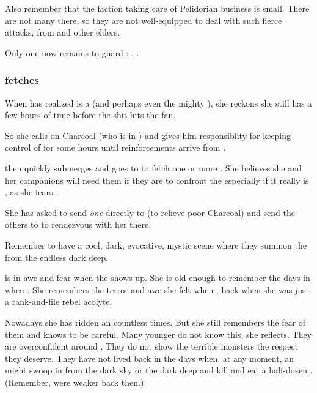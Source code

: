 Also remember that the faction taking care of Pelidorian business is small. 
There are not many \resphain there, so they are not well-equipped to deal with such fierce \dragon attacks, from \shaeeroth and other elders.

Only one \resphan{} now remains to guard \Malcur: \Paerzim. 
. 





\subsubsection{\Achsah fetches \umbrae}
When \Achsah{} has realized \Takestsha{} is a \dragon{} (and perhaps even the mighty \Nzessuacrith), she reckons she still has a few hours of time before the shit hits the fan. 

So she calls on Charcoal (who is in \Forclin) and gives him responsiblity for keeping control of \Forclin{} for some hours until reinforcements arrive from \Malcur. 

\Achsah{} then quickly submerges and goes to \Nyx{} to fetch one or more \umbrae. 
She believes she and her companions will need them if they are to confront the \dragon\dash especially if it really is \Nzessuacrith, as she fears. 

She has asked \Teshrial{} to send \emph{one} \resphan{} directly to \Forclin{} (to relieve poor Charcoal) and send the others to \Nyx{} to rendezvous with her there. 

Remember to have a cool, dark, evocative, mystic scene where they summon the \umbrae{} from the endless dark deep. 

\Achsah{} is in awe and fear when the \umbra{} shows up. 
She is old enough to remember the days in \Merkyrah{} when . 
She remembers the terror and awe she felt when , back when she was just a rank-and-file rebel acolyte. 

Nowadays she has ridden an \umbra{} countless times. 
But she still remembers the fear of them and knows to be careful. 
Many younger \resphain{} do not know this, she reflects. 
They are overconfident around \umbrae.
They do not show the terrible monsters the respect they deserve. 
They have not lived back in the days when, at any moment, an \umbra{} might swoop in from the dark sky or the dark deep and kill and eat a half-dozen \resphain. 
(Remember, \resphain{} were weaker back then.)









